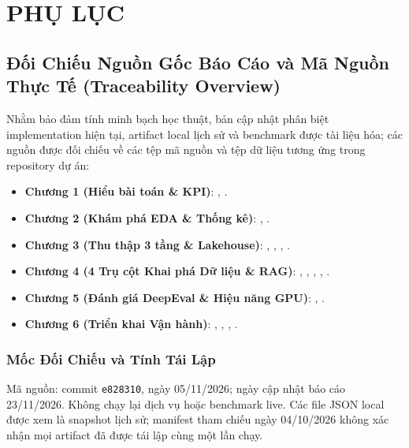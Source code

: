 
\chapter*{PHỤ LỤC}
\renewcommand{\thesection}{\Alph{section}}
\setcounter{section}{0}

\section{Đối Chiếu Nguồn Gốc Báo Cáo và Mã Nguồn Thực Tế (Traceability Overview)}

Nhằm bảo đảm tính minh bạch học thuật, bản cập nhật phân biệt implementation hiện tại, artifact local lịch sử và benchmark được tài liệu hóa; các nguồn được đối chiếu về các tệp mã nguồn và tệp dữ liệu tương ứng trong repository dự án:

\begin{itemize}[leftmargin=1.5cm]
  \item \textbf{Chương 1 (Hiểu bài toán \& KPI)}: , .
  \item \textbf{Chương 2 (Khám phá EDA \& Thống kê)}: , .
  \item \textbf{Chương 3 (Thu thập 3 tầng \& Lakehouse)}: , , , .
  \item \textbf{Chương 4 (4 Trụ cột Khai phá Dữ liệu \& RAG)}: , , , , .
  \item \textbf{Chương 5 (Đánh giá DeepEval \& Hiệu năng GPU)}: , .
  \item \textbf{Chương 6 (Triển khai Vận hành)}: , , , .
\end{itemize}

\subsection{Mốc Đối Chiếu và Tính Tái Lập}
Mã nguồn: commit \texttt{e828310}, ngày 05/11/2026; ngày cập nhật báo cáo 23/11/2026. Không chạy lại dịch vụ hoặc benchmark live. Các file JSON local được xem là snapshot lịch sử; manifest tham chiếu ngày 04/10/2026 không xác nhận mọi artifact đã được tái lập cùng một lần chạy.

